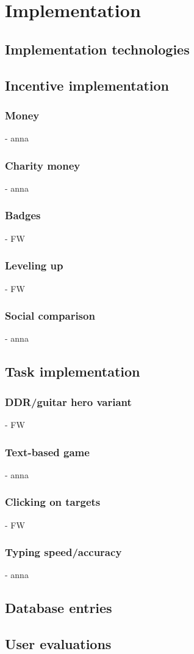 \section{Implementation}


\subsection{Implementation technologies}

\subsection{Incentive implementation}
\subsubsection{Money} - anna
\subsubsection{Charity money} - anna
\subsubsection{Badges} - FW
\subsubsection{Leveling up} - FW
\subsubsection{Social comparison} - anna

\subsection{Task implementation}
\subsubsection{DDR/guitar hero variant} - FW
\subsubsection{Text-based game} - anna
\subsubsection{Clicking on targets} - FW
\subsubsection{Typing speed/accuracy} - anna

\subsection{Database entries}
\subsection{User evaluations}